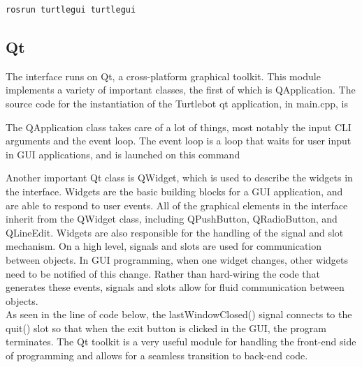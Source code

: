 \documentclass[12]{article}
\begin{document}
\begin{lstlisting}[style=bash]
rosrun turtlegui turtlegui
\end{lstlisting}
\subsection{Qt}
The interface runs on Qt, a cross-platform graphical toolkit. This module implements a variety of important classes, the first of which is QApplication. The source code for the instantiation of the Turtlebot qt application, in main.cpp, is

%
The QApplication class takes care of a lot of things, most notably the input CLI arguments and the event loop. The event loop is a loop that waits for user input in GUI applications, and is launched on this command

%
Another important Qt class is QWidget, which is used to describe the widgets in the interface. Widgets are the basic building blocks for a GUI application, and are able to respond to user events. All of the graphical elements in the interface inherit from the QWidget class, including QPushButton, QRadioButton, and QLineEdit. Widgets are also responsible for the handling of the signal and slot mechanism. On a high level, signals and slots are used for communication between objects. In GUI programming, when one widget changes, other widgets need to be notified of this change. Rather than hard-wiring the code that generates these events, signals and slots allow for fluid communication between objects.\\ 

As seen in the line of code below, the lastWindowClosed() signal connects to the quit() slot so that when the exit button is clicked in the GUI, the program terminates.
%
The Qt toolkit is a very useful module for handling the front-end side of programming and allows for a seamless transition to back-end code.
\end{document}
